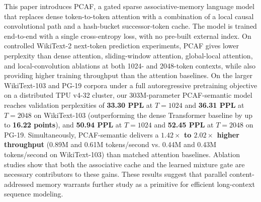 \documentclass[11pt]{article}
\begin{document}
This paper introduces PCAF, a gated sparse associative-memory language
model that replaces dense token-to-token attention with a combination of a
local causal convolutional path and a hash-bucket successor-token cache. The
model is trained end-to-end with a single cross-entropy loss, with no
pre-built external index. On controlled WikiText-2 next-token prediction experiments,
PCAF gives lower perplexity than dense attention, sliding-window attention,
global-local attention, and local-convolution ablations at both 1024- and
2048-token contexts, while also providing higher training throughput than the
attention baselines. On the larger WikiText-103 and PG-19
corpora under a full autoregressive pretraining objective on a distributed TPU v4-32 cluster,
our 303M-parameter PCAF-semantic model reaches validation perplexities of
\textbf{33.30 PPL} at $T=1024$ and \textbf{36.31 PPL} at $T=2048$ on WikiText-103 (outperforming the
dense Transformer baseline by up to \textbf{16.22 points}), and \textbf{50.94 PPL} at $T=1024$ and \textbf{52.45 PPL} at $T=2048$ on PG-19.
Simultaneously, PCAF-semantic delivers a \textbf{\(1.42\times\) to \(2.02\times\) higher throughput}
(0.89M and 0.61M tokens/second vs. 0.44M and 0.43M tokens/second on WikiText-103) than matched attention baselines.
Ablation studies show that both the associative cache and the learned mixture
gate are necessary contributors to these gains. These results suggest that
parallel content-addressed memory warrants further study as a primitive for
efficient long-context sequence modeling.



\end{document}
